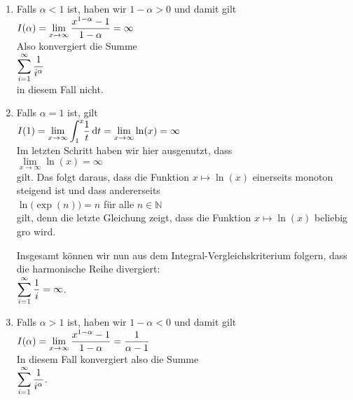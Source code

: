 \begin{enumerate}
\item Falls $\alpha < 1$ ist, haben wir $1-\alpha>0$ und damit gilt
      \\[0.2cm]
      \hspace*{1.3cm}
      $\displaystyle I(\alpha) = \lim\limits_{x \rightarrow \infty} \frac{x^{1-\alpha}-1}{1-\alpha} = \infty$
      \\[0.2cm]
      Also konvergiert die Summe 
      \\[0.2cm]
      \hspace*{1.3cm}
      $\displaystyle \sum\limits_{i=1}^{\infty} \frac{1}{i^\alpha}$
      \\[0.2cm]
      in diesem Fall nicht.
\item Falls $\alpha = 1$ ist, gilt
      \\[0.2cm]
      \hspace*{1.3cm}
      $I(1) = \lim\limits_{x \rightarrow \infty} \dint{1}{x}\; \frac{1}{t}\, \dr t 
            =  \lim\limits_{x \rightarrow \infty} \ln(x)  = \infty
      $
      \\[0.2cm]
      Im letzten Schritt haben wir hier ausgenutzt, dass
      \\[0.2cm]
      \hspace*{1.3cm}
      $\lim\limits_{x \rightarrow \infty} \ln(x) = \infty$
      \\[0.2cm]
      gilt.  Das folgt daraus, dass die Funktion $x \mapsto \ln(x)$ einerseits monoton steigend ist und
      dass andererseits 
      \\[0.2cm]
      \hspace*{1.3cm}
      $\ln\bigl(\exp(n)\bigr) = n$ \quad f\"ur alle $n \in \mathbb{N}$  
      \\[0.2cm]
      gilt, denn die letzte Gleichung zeigt, dass die Funktion $x \mapsto \ln(x)$ beliebig gro\3 wird. 

      Insgesamt k\"onnen wir nun aus dem Integral-Vergleichskriterium folgern, dass die
      harmonische Reihe divergiert:
      \\[0.2cm]
      \hspace*{1.3cm}
      $\displaystyle\sum\limits_{i=1}^{\infty} \frac{1}{i} = \infty$.
\item Falls $\alpha > 1$ ist, haben wir $1-\alpha<0$ und damit gilt
      \\[0.2cm]
      \hspace*{1.3cm}
      $\displaystyle I(\alpha) = \lim\limits_{x \rightarrow \infty} \frac{x^{1-\alpha}-1}{1-\alpha} = \frac{1}{\alpha-1}$
      \\[0.2cm]
      In diesem Fall konvergiert also die Summe 
      \\[0.2cm]
      \hspace*{1.3cm}
      $\displaystyle \sum\limits_{i=1}^{\infty} \frac{1}{i^\alpha}$.
\end{enumerate}

